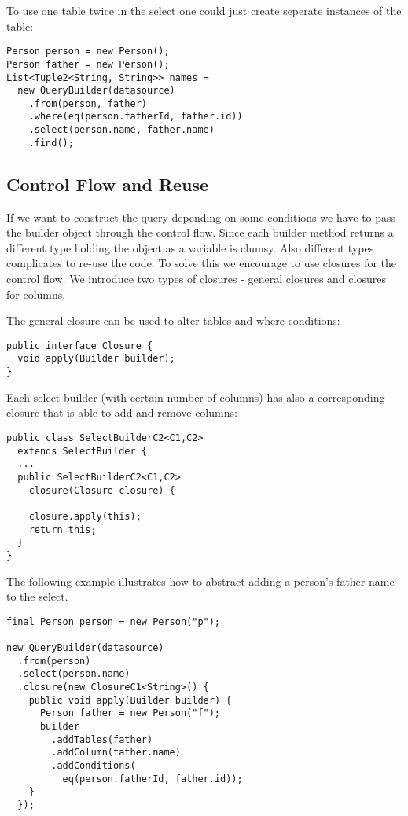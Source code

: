 \documentclass{sig-alternate}
\begin{document}
To use one table twice in the select one could just create seperate instances of the table:

\begin{verbatim}
Person person = new Person();
Person father = new Person();
List<Tuple2<String, String>> names = 
  new QueryBuilder(datasource)
    .from(person, father)
    .where(eq(person.fatherId, father.id))
    .select(person.name, father.name)
    .find();
\end{verbatim}

\subsection{Control Flow and Reuse}

If we want to construct the query depending on some conditions we have to pass the builder object through the control flow.
Since each builder method returns a different type holding the object as a variable is clumsy. Also different types complicates to re-use the code.
To solve this we encourage to use closures for the control flow.
We introduce two types of closures - general closures and closures for columns. 

The general closure can be used to alter tables and where conditions:

\begin{verbatim}
public interface Closure {
  void apply(Builder builder);
}
\end{verbatim}

Each select builder (with certain number of columns) has also a corresponding closure that is able to add and remove columns:

\begin{verbatim}
public class SelectBuilderC2<C1,C2> 
  extends SelectBuilder {
  ...
  public SelectBuilderC2<C1,C2> 
    closure(Closure closure) {

    closure.apply(this);
    return this;
  }
}
\end{verbatim}

The following example illustrates how to abstract adding a person's father name to the select.

\begin{verbatim}
final Person person = new Person("p");

new QueryBuilder(datasource)
  .from(person)
  .select(person.name)
  .closure(new ClosureC1<String>() {
    public void apply(Builder builder) {
      Person father = new Person("f");
      builder
        .addTables(father)
        .addColumn(father.name)
        .addConditions(
          eq(person.fatherId, father.id));
    }
  });
\end{verbatim}
\end{document}
